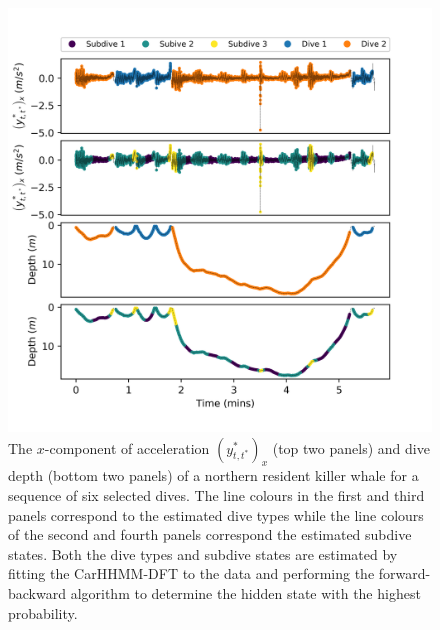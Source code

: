 \begin{figure}[ht]
	\centering
	\includegraphics[width=5in]{../Plots/CarHHMM2_decoded_dives.png}
	\caption{The $x$-component of acceleration $\left(y^*_{t,t^*}\right)_x$ (top two panels) and dive depth (bottom two panels) of a northern resident killer whale for a sequence of six selected dives. The line colours in the first and third panels correspond to the estimated dive types while the line colours of the second and fourth panels correspond the estimated subdive states. Both the dive types and subdive states are estimated by fitting the CarHHMM-DFT to the data and performing the forward-backward algorithm to determine the hidden state with the highest probability.}
	\label{fig:labeled_dives}
\end{figure}


